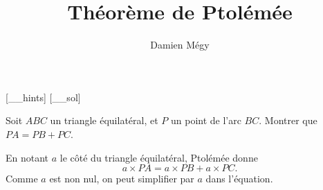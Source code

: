 




[_\jobname_hints]
[_\jobname_sol]


\title{Théorème de Ptolémée}
\author{Damien Mégy}
\maketitle

\avertissement 




\begin{exo}
Soit $ABC$ un triangle équilatéral, et $P$ un point de l'arc $BC$. Montrer que $PA=PB+PC$.
\begin{sol}
En notant $a$ le côté du triangle équilatéral, Ptolémée donne 
\[ a\times PA = a\times PB+a\times PC.\]
Comme $a$ est non nul, on peut simplifier par $a$ dans l'équation.
\end{sol}
\end{exo}


